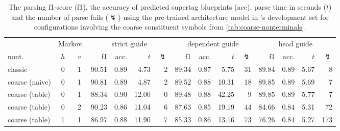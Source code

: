 \documentclass[../../document.tex]{subfiles}
\begin{document}
    \begin{table}
        \caption{\label{tbl:gridsearch:coarse:3}
        The parsing f1-score (f1), the accuracy of predicted supertag blueprints (acc), parse time in seconds ($t$) and the number of parse fails ($\lightning$) using the pre-trained architecture model in \negra{}'s development set for configurations involving the coarse constituent symbols from \cref{tab:coarse-nonterminals}.
        }
        \centering
        \vspace{.2cm}
        \setlength{\tabcolsep}{3.5pt}
        \begin{tabular}{lcc|rrrr|rrrr|rrrr}
            \toprule
    & \multicolumn{2}{c|}{Markov.}         & \multicolumn{4}{c|}{strict guide} &  \multicolumn{4}{c|}{dependent guide} &  \multicolumn{4}{c}{head guide} \\
    nont.           & \(h\) & \(v\) & f1 & acc. & $t$ & $\lightning$ & f1 & acc. & $t$ & $\lightning$  & f1 & acc. & $t$ & $\lightning$  \\ \hline\rowcolor{black!10}
classic        & 0 & 1 & 90.51 & 0.89 &  4.73 & 2 & 89.34 & 0.87 &  5.75 & 31 & 89.84 & 0.89 & 5.67 & 8 \\\rowcolor{black!10}
coarse (naive) & 0 & 1 & 90.81 & 0.89 &  4.87 & 2 & 89.52 & 0.88 & 10.31 & 18 & 89.85 & 0.89 & 5.69 & 7 \\\hline
coarse (table) & 0 & 1 & 88.34 & 0.90 & 12.00 & 0 & 89.48 & 0.88 & 42.25 &  9 & 89.85 & 0.89 & 5.77 & 7 \\
coarse (table) & 0 & 2 & 90.23 & 0.86 & 11.04 & 6 & 87.63 & 0.85 & 19.19 & 44 & 84.66 & 0.84 & 5.31 & 72 \\
coarse (table) & 1 & 1 & 86.97 & 0.88 & 11.90 & 7 & 85.33 & 0.86 & 13.16 & 73 & 76.26 & 0.84 & 5.27 & 173 \\
\bottomrule
        \end{tabular}
    \end{table}
\end{document}
